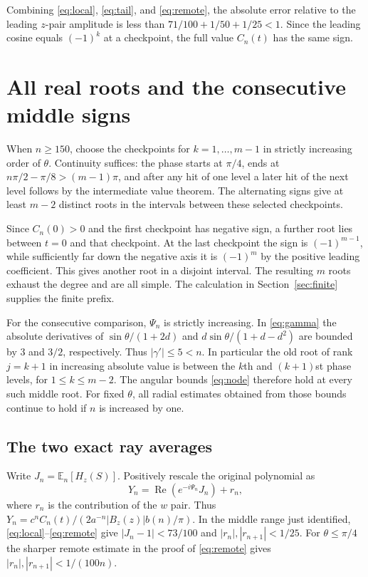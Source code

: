 \documentclass[11pt]{article}
\begin{document}
Combining \eqref{eq:local}, \eqref{eq:tail}, and \eqref{eq:remote}, the absolute error relative to the leading $z$-pair amplitude is less than $71/100+1/50+1/25<1$. Since the leading cosine equals $(-1)^k$ at a checkpoint, the full value $C_n(t)$ has the same sign.

\section{All real roots and the consecutive middle signs}\label{sec:middle}
When $n\ge150$, choose the checkpoints for $k=1,\dots,m-1$ in strictly increasing order of $\theta$. Continuity suffices: the phase starts at $\pi/4$, ends at $n\pi/2-\pi/8>(m-1)\pi$, and after any hit of one level a later hit of the next level follows by the intermediate value theorem. The alternating signs give at least $m-2$ distinct roots in the intervals between these selected checkpoints.

Since $C_n(0)>0$ and the first checkpoint has negative sign, a further root lies between $t=0$ and that checkpoint. At the last checkpoint the sign is $(-1)^{m-1}$, while sufficiently far down the negative axis it is $(-1)^m$ by the positive leading coefficient. This gives another root in a disjoint interval. The resulting $m$ roots exhaust the degree and are all simple. The calculation in Section~\ref{sec:finite} supplies the finite prefix.

For the consecutive comparison, $\Psi_n$ is strictly increasing. In \eqref{eq:gamma} the absolute derivatives of $\sin\theta/(1+2d)$ and $d\sin\theta/(1+d-d^2)$ are bounded by $3$ and $3/2$, respectively. Thus $|\gamma'|\le5<n$. In particular the old root of rank $j=k+1$ in increasing absolute value is between the $k$th and $(k+1)$st phase levels, for $1\le k\le m-2$. The angular bounds \eqref{eq:node} therefore hold at every such middle root. For fixed $\theta$, all radial estimates obtained from those bounds continue to hold if $n$ is increased by one.

\subsection{The two exact ray averages}
Write $J_n=\mathbb E_n[H_z(S)]$. Positively rescale the original polynomial as
\[
Y_n=\operatorname{Re}(e^{-i\Psi_n}J_n)+r_n ,
\]
where $r_n$ is the contribution of the $w$ pair. Thus $Y_n=c^n C_n(t)/(2a^{-n}|B_z(z)|b(n)/\pi)$. In the middle range just identified, \eqref{eq:local}--\eqref{eq:remote} give $|J_n-1|<73/100$ and $|r_n|,|r_{n+1}|<1/25$. For $\theta\le\pi/4$ the sharper remote estimate in the proof of \eqref{eq:remote} gives $|r_n|,|r_{n+1}|<1/(100n)$.
\end{document}
